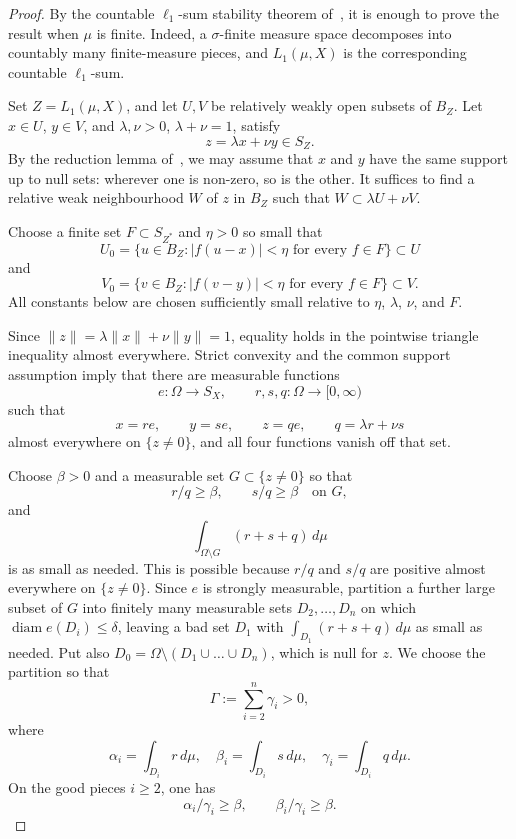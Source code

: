 \documentclass[11pt]{article}
\begin{document}
\begin{proof}
By the countable \(\ell_1\)-sum stability theorem of~\cite[Proposition
1.2]{HKP25}, it is enough to prove the result when \(\mu\) is finite.
Indeed, a \(\sigma\)-finite measure space decomposes into countably many
finite-measure pieces, and \(L_1(\mu,X)\) is the corresponding countable
\(\ell_1\)-sum.

Set \(Z=L_1(\mu,X)\), and let \(U,V\) be relatively weakly open subsets of
\(B_Z\).  Let \(x\in U\), \(y\in V\), and \(\lambda,\nu>0\),
\(\lambda+\nu=1\), satisfy
\[
  z=\lambda x+\nu y\in S_Z.
\]
By the reduction lemma of~\cite[Lemma 2.1]{HKP25}, we may assume that \(x\)
and \(y\) have the same support up to null sets: wherever one is non-zero, so
is the other.  It suffices to find a relative weak neighbourhood \(W\) of
\(z\) in \(B_Z\) such that \(W\subset\lambda U+\nu V\).

Choose a finite set \(F\subset S_{Z^*}\) and \(\eta>0\) so small that
\[
  U_0=\{u\in B_Z: |f(u-x)|<\eta\text{ for every }f\in F\}\subset U
\]
and
\[
  V_0=\{v\in B_Z: |f(v-y)|<\eta\text{ for every }f\in F\}\subset V.
\]
All constants below are chosen sufficiently small relative to \(\eta\),
\(\lambda\), \(\nu\), and \(F\).

Since \(\|z\|=\lambda\|x\|+\nu\|y\|=1\), equality holds in the pointwise
triangle inequality almost everywhere.  Strict convexity and the common
support assumption imply that there are measurable functions
\[
  e:\Omega\to S_X,\qquad r,s,q:\Omega\to[0,\infty)
\]
such that
\[
  x=r e,\qquad y=s e,\qquad z=q e,\qquad q=\lambda r+\nu s
\]
almost everywhere on \(\{z\ne0\}\), and all four functions vanish off that set.

Choose \(\beta>0\) and a measurable set \(G\subset\{z\ne0\}\) so that
\[
  r/q\ge\beta,\qquad s/q\ge\beta\quad\text{on }G,
\]
and
\[
  \int_{\Omega\setminus G}(r+s+q)\,d\mu
\]
is as small as needed.  This is possible because \(r/q\) and \(s/q\) are
positive almost everywhere on \(\{z\ne0\}\).  Since \(e\) is strongly
measurable, partition a further large subset of \(G\) into finitely many
measurable sets \(D_2,\dots,D_n\) on which \(\operatorname{diam} e(D_i)\le
\delta\), leaving a bad set \(D_1\) with
\(\int_{D_1}(r+s+q)\,d\mu\) as small as needed.  Put also
\(D_0=\Omega\setminus(D_1\cup\dots\cup D_n)\), which is null for \(z\).  We
choose the partition so that
\[
  \Gamma:=\sum_{i=2}^n\gamma_i>0,
\]
where
\[
  \alpha_i=\int_{D_i}r\,d\mu,\quad
  \beta_i=\int_{D_i}s\,d\mu,\quad
  \gamma_i=\int_{D_i}q\,d\mu .
\]
On the good pieces \(i\ge2\), one has
\[
  \alpha_i/\gamma_i\ge\beta,\qquad \beta_i/\gamma_i\ge\beta.
\]


\end{proof}
\end{document}
